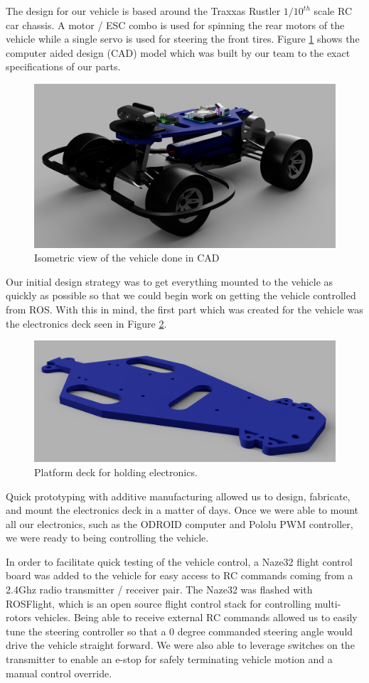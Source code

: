 \documentclass[letterpaper, 10 pt, conference]{ieeeconf}  %
\begin{document}
The design for our vehicle is based around the Traxxas Rustler $1/10^{th}$ scale RC car chassis. A motor / ESC combo is used for spinning the rear motors of the vehicle while a single servo is used for steering the front tires. Figure \ref{iso} shows the computer aided design (CAD) model which was built by our team to the exact specifications of our parts.

\begin{figure}[h]
\begin{center}
\includegraphics[width=.48\textwidth]{Figures/ISO_view_HARE.png}
\caption{Isometric view of the vehicle done in CAD}
\label{iso}
\end{center}
\end{figure}

Our initial design strategy was to get everything mounted to the vehicle as quickly as possible so that we could begin work on getting the vehicle controlled from ROS. With this in mind, the first part which was created for the vehicle was the electronics deck seen in Figure \ref{platform}.

\begin{figure}[h]
\begin{center}
\includegraphics[width=.48\textwidth]{Figures/platform.png}
\caption{Platform deck for holding electronics.}
\label{platform}
\end{center}
\end{figure}

Quick prototyping with additive manufacturing allowed us to design, fabricate, and mount the electronics deck in a matter of days. Once we were able to mount all our electronics, such as the ODROID computer and Pololu PWM controller, we were ready to being controlling the vehicle. 

In order to facilitate quick testing of the vehicle control, a Naze32 flight control board was added to the vehicle for easy access to RC commands coming from a 2.4Ghz radio transmitter / receiver pair. The Naze32 was flashed with ROSFlight, which is an open source flight control stack for controlling multi-rotors vehicles. Being able to receive external RC commands allowed us to easily tune the steering controller so that a 0 degree commanded steering angle would drive the vehicle straight forward. We were also able to leverage switches on the transmitter to enable an e-stop for safely terminating vehicle motion and a manual control override.
\end{document}

